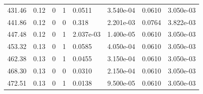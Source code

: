 \documentclass[preview]{standalone}
\begin{document}
{{{\begin{tabular}{L{1.2cm}C{1.2cm} C{0.3cm}C{0.5cm} C{1.4cm}C{1.4cm} C{1.4cm}C{1.4cm}}
  431.46  &  0.12  & 0     &  1 &  0.0511  & 3.540e-04  & 0.0610 &  3.050e-03   \\ 
  441.86  &  0.12  & 0     &  0 &  0.318  & 2.201e-03  & 0.0764 &  3.822e-03   \\ 
  447.48  &  0.12  & 0     &  1 &  2.037e-03  & 1.400e-05  & 0.0610 &  3.050e-03   \\ 
  453.32  &  0.13  & 0     &  1 &  0.0585  & 4.050e-04  & 0.0610 &  3.050e-03   \\ 
  462.38  &  0.13  & 0     &  1 &  0.0455  & 3.150e-04  & 0.0610 &  3.050e-03   \\ 
  468.30  &  0.13  & 0     &  0 &  0.0310  & 2.150e-04  & 0.0610 &  3.050e-03   \\ 
  472.51  &  0.13  & 0     &  1 &  0.0138  & 9.500e-05  & 0.0610 &  3.050e-03   \\ 
\hline 
\end{tabular} 

}}}
\end{document}
